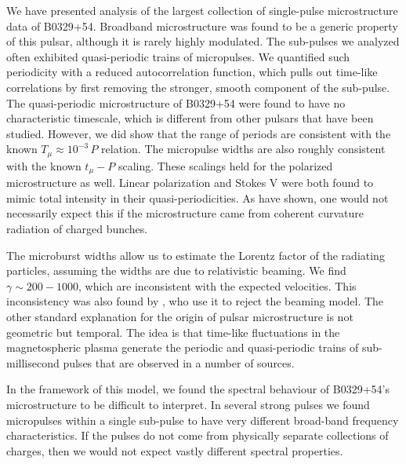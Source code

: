 We have presented analysis of the largest collection 
of single-pulse microstructure data of 
B0329+54. Broadband microstructure was found to be a 
generic property of this pulsar, although it is
rarely highly modulated. The sub-pulses we analyzed often 
exhibited quasi-periodic trains of micropulses. We 
quantified such periodicity with a reduced autocorrelation 
function, which pulls out time-like correlations by 
first removing the stronger, smooth component of the 
sub-pulse. The quasi-periodic microstructure of B0329+54
were found to have no characteristic timescale, which is
different from other pulsars that have been studied. 
However, we did show that the range of periods are 
consistent with the known $T_\mu \approx 10^{-3}\,P$ relation. 
The micropulse widths are also roughly consistent with 
the known $t_\mu-P$ scaling. These scalings held for 
the polarized microstructure as well. Linear polarization 
and Stokes V were both found to mimic total intensity in 
their quasi-periodicities. As \citet{2015ApJ...806..236M} 
have shown, one would not necessarily expect this 
if the microstructure came from 
coherent curvature radiation of charged bunches.

The microburst widths allow us to estimate the Lorentz 
factor of the radiating particles, assuming the widths 
are due to relativistic beaming. We find $\gamma\sim200-1000$, 
which are inconsistent with the expected velocities. 
This inconsistency was also found by \citet{1998A&A...332..111L}, 
who use it to reject the beaming model. The other standard 
explanation for the origin of pulsar microstructure is not 
geometric but temporal. The idea is that time-like 
fluctuations in the magnetospheric plasma generate the 
periodic and quasi-periodic trains of sub-millisecond pulses
that are observed in a number of sources. 

In the framework of this model, we found the spectral 
behaviour of B0329+54's microstructure to be difficult
to interpret. In several strong pulses we found 
micropulses within a single sub-pulse to have very different 
broad-band frequency characteristics. If the pulses 
do not come from physically separate collections of 
charges, then we would not expect vastly different 
spectral properties. 

